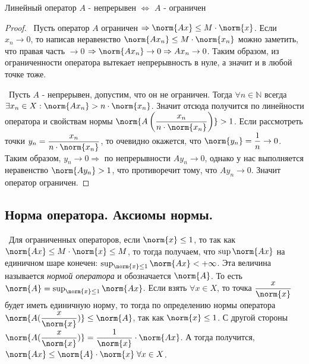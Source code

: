 \begin{theorem*}
    Линейный оператор $A$ - непрерывен $\Longleftrightarrow$ $A$ - ограничен
\end{theorem*}
\begin{proof}
\smallskip
\par\noindent\textbullet~Пусть оператор $A$ ограничен $\Rightarrow \norm{A x} \le M \cdot \norm{x}$. Если $x_n \to 0$, то написав неравенство $\norm{A x_n} \le 
M \cdot \norm{x_n}$ можно заметить, что правая часть $ \to 0$ $\Rightarrow \norm{A x_n} \to 0 \Rightarrow A x_n \to 0$. Таким образом, из ограниченности оператора 
вытекает непрерывность в нуле, а значит и в любой точке тоже.

\medskip
\noindent\textbullet~Пусть $A$ - непрерывен, допустим, что он не ограничен. Тогда $\forall n \in \mathbb{N}$ всегда $\exists x_n \in X : \norm{A x_n} > n \cdot 
\norm{x_n}$. Значит отсюда получится по линейности оператора и свойствам нормы $\norm{A \left( \dfrac{x_n}{n \cdot \norm{x_n}}\right)} > 1$. Если рассмотреть точки 
$y_n = \dfrac{x_n}{n \cdot \norm{x_n}}$, то очевидно окажется, что $\norm{y_n} = \dfrac{1}{n} \to 0$. Таким образом, $y_n \to 0 \Rightarrow$ по непрерывности 
$A y_n \to 0$, однако у нас выполняется неравенство $\norm{A y_n} > 1$, что противоречит тому, что $A y_n \to 0$. Значит оператор ограничен.
\end{proof}

\subsection*{Норма оператора. Аксиомы нормы.}

\noindent\textasteriskcentered~Для ограниченных операторов, если $\norm{x} \le 1$, то так как $\norm{A x} \le M \cdot \norm{x} \le M$, то тогда получаем, что $\sup \norm{A x}$ на 
единичном шаре конечен: $\sup_{\norm{x} \le 1} \norm{A x} < + \infty$. Эта величина называется \textit{нормой оператора} и обозначается $\norm{A}$. То есть $\norm{A} = 
\sup_{\norm{x} \le 1} \norm{A x}$. Если взять $\forall x \in X$, то точка $\dfrac{x}{\norm{x}}$ будет иметь единичную норму, то тогда по определению нормы оператора 
$\norm{A (\dfrac{x}{\norm{x}})} \le \norm{A}$, так как $\norm{x} \le 1$. С другой стороны $\norm{A (\dfrac{x}{\norm{x}})} = \dfrac{1}{\norm{x}} \cdot \norm{A x}$. А тогда получится, $\norm{A x} 
\le \norm{A} \cdot {\norm{x}} \; \forall x \in X$.

